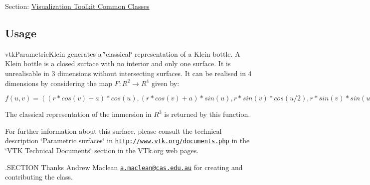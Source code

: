 Section\-: \hyperlink{sec_vtkcommon}{Visualization Toolkit Common Classes} \hypertarget{vtkwidgets_vtkxyplotwidget_Usage}{}\subsection{Usage}\label{vtkwidgets_vtkxyplotwidget_Usage}
vtk\-Parametric\-Klein generates a \char`\"{}classical\char`\"{} representation of a Klein bottle. A Klein bottle is a closed surface with no interior and only one surface. It is unrealisable in 3 dimensions without intersecting surfaces. It can be realised in 4 dimensions by considering the map $F:R^2 \rightarrow R^4$ given by\-:


\begin{DoxyItemize}
\item $f(u,v) = ((r*cos(v)+a)*cos(u),(r*cos(v)+a)*sin(u),r*sin(v)*cos(u/2),r*sin(v)*sin(u/2))$
\end{DoxyItemize}

The classical representation of the immersion in $R^3$ is returned by this function.

For further information about this surface, please consult the technical description \char`\"{}\-Parametric surfaces\char`\"{} in \href{http://www.vtk.org/documents.php}{\tt http\-://www.\-vtk.\-org/documents.\-php} in the \char`\"{}\-V\-T\-K Technical Documents\char`\"{} section in the V\-Tk.\-org web pages.

.S\-E\-C\-T\-I\-O\-N Thanks Andrew Maclean \href{mailto:a.maclean@cas.edu.au}{\tt a.\-maclean@cas.\-edu.\-au} for creating and contributing the class.

